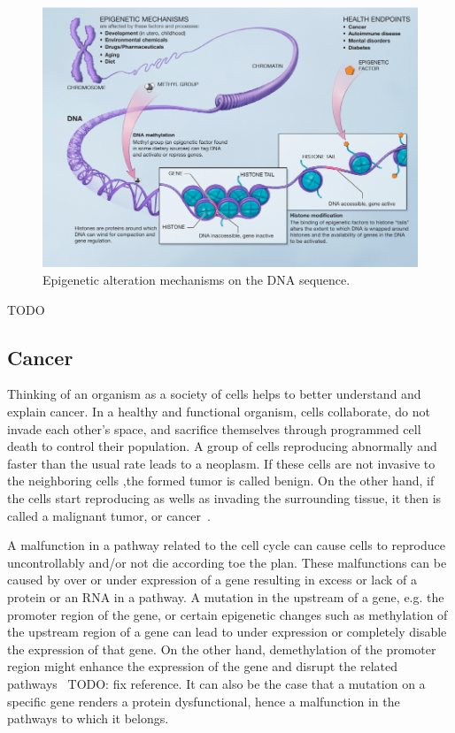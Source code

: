 \begin{figure}[!ht]
  \centering
  \includegraphics[width=1\textwidth]{figs/background/epigeneticmechanisms}
  \caption[Epigenetic alteration mechanisms on the DNA sequence.]{Epigenetic alteration mechanisms on the DNA sequence\protect\footnotemark.}
  \label{fig:bkg:epigenetics}
\end{figure}

TODO

\subsection{Cancer}
\label{sec:bkg:cancer}
Thinking of an organism as a society of cells helps to better understand and explain cancer. In a healthy and functional organism, cells collaborate, do not invade each other's space, and sacrifice themselves through programmed cell death to control their population. A group of cells reproducing abnormally and faster than the usual rate leads to a neoplasm. If these cells are not invasive to the neighboring cells ,the formed tumor is called benign. On the other hand, if the cells start reproducing as wells as invading the surrounding tissue, it then is called a malignant tumor, or cancer~\cite[Ch. 20]{the-cell}.

A malfunction in a pathway related to the cell cycle can cause cells to reproduce uncontrollably and/or not die according toe the plan. These malfunctions can be caused by over or under expression of a gene resulting in excess or lack of a protein or an RNA in a pathway. A mutation in the upstream of a gene, e.g. the promoter region of the gene, or certain epigenetic changes such as methylation of the upstream region of a gene can lead to under expression or completely disable the expression of that gene. On the other hand, demethylation of the promoter region might enhance the expression of the gene and disrupt the related pathways~\cite{methylation-cancer} TODO: fix reference. It can also be the case that a mutation on a specific gene renders a protein dysfunctional, hence a malfunction in the pathways to which it belongs.

